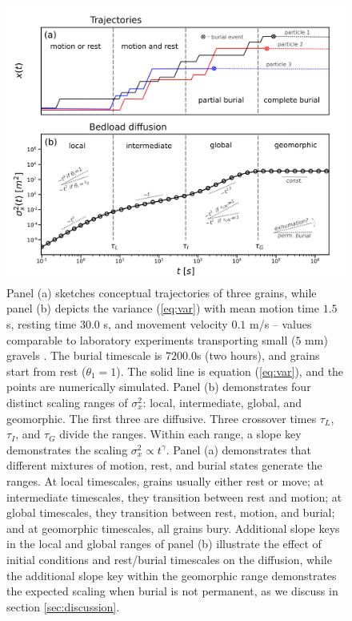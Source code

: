 \begin{figure}[!htbp]	
	\includegraphics[width=\linewidth,keepaspectratio]{./figures/ch4/diffusion.png}
	\caption{Panel (a) sketches conceptual trajectories of three grains, while panel (b) depicts the variance (\ref{eq:var}) with mean motion time $1.5$ s, resting time $30.0$ s, and movement velocity $0.1$ m/s -- values comparable to laboratory experiments transporting small ($5$ mm) gravels \citep{Lajeunesse2010,Martin2012}. The burial timescale is $7200.0$s (two hours), and grains start from rest ($\theta_1=1$). The solid line is equation (\ref{eq:var}), and the points are numerically simulated. Panel (b) demonstrates four distinct scaling ranges of $\sigma_x^2$: local, intermediate, global, and geomorphic. The first three are diffusive. Three crossover times $\tau_L$, $\tau_I$, and $\tau_G$ divide the ranges. Within each range, a slope key demonstrates the scaling $\sigma_x^2 \propto t^\gamma$. Panel (a) demonstrates that different mixtures of motion, rest, and burial states generate the ranges. At local timescales, grains usually either rest or move; at intermediate timescales, they transition between rest and motion; at global timescales, they transition between rest, motion, and burial; and at geomorphic timescales, all grains bury. Additional slope keys in the local and global ranges of panel (b) illustrate the effect of initial conditions and rest/burial timescales on the diffusion, while the additional slope key within the geomorphic range demonstrates the expected scaling when burial is not permanent, as we discuss in section \ref{sec:discussion}.
	}
	\label{fig:var}
\end{figure}

